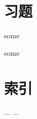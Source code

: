 
\section*{习题}\label{5-1}

\begin{exe}
some
\end{exe}

\begin{exe}
some
\end{exe}


\section*{索引}\label{5-1}
\begin{Glossary}
\item[...] ...
\end{Glossary}



